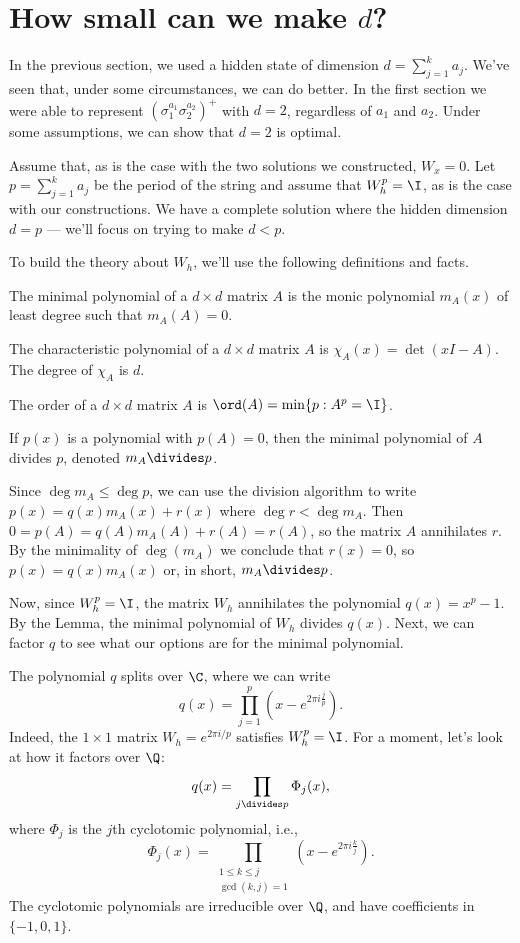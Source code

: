 \section*{How small can we make $d$?}
In the previous section, we used a hidden state of dimension $d = \sum_{j = 1}^k a_j$. We've seen that, under some circumstances, we can do better. In the first section we were able to represent $(\sigma_1^{a_1} \sigma_2^{a_2})^+$ with $d = 2$, regardless of $a_1$ and $a_2$. Under some assumptions, we can show that $d = 2$ is optimal.

Assume that, as is the case with the two solutions we constructed, $W_x = 0$. Let $p = \sum_{j = 1}^k a_j$ be the period of the string and assume that $W_h^p = \I$, as is the case with our constructions. We have a complete solution where the hidden dimension $d = p$ — we'll focus on trying to make $d < p$.

To build the theory about $W_h$, we'll use the following definitions and facts.

 The minimal polynomial of a $d \times d$ matrix $A$ is the monic polynomial $m_A(x)$ of least degree such that $m_A(A) = 0$.\eddefn

 The characteristic polynomial of a $d \times d$ matrix $A$ is $\chi_A(x) = \det(xI - A)$. The degree of $\chi_A$ is $d$.\eddefn

\bddefn[Order] The order of a $d \times d$ matrix $A$ is $\ord(A) = \min \{p : A^p = \I\}$.\eddefn

\bllem If $p(x)$ is a polynomial with $p(A) = 0$, then the minimal polynomial of $A$ divides $p$, denoted $m_A \divides p$.\ellem

\bpf Since $\deg m_A \leq \deg p$, we can use the division algorithm to write $p(x) = q(x) m_A(x) + r(x)$ where $\deg r < \deg m_A$. Then $0 = p(A) = q(A) m_A(A) + r(A) = r(A)$, so the matrix $A$ annihilates $r$. By the minimality of $\deg(m_A)$ we conclude that $r(x) = 0$, so $p(x) = q(x) m_A(x)$ or, in short, $m_A \divides p$.\epf

Now, since $W_h^p = \I$, the matrix $W_h$ annihilates the polynomial $q(x) = x^p - 1$. By the Lemma, the minimal polynomial of $W_h$ divides $q(x)$. Next, we can factor $q$ to see what our options are for the minimal polynomial.

The polynomial $q$ splits over $\C$, where we can write \[ q(x) = \prod_{j=1}^p \left(x - e^{2 \pi i \frac{j}{p}}\right). \] Indeed, the $1 \times 1$ matrix $W_h = e^{2 \pi i / p}$ satisfies $W_h^p = \I$. For a moment, let's look at how it factors over $\Q$: \[ q(x) = \prod_{j \divides p} \Phi_j(x), \] where $\Phi_j$ is the $j$th cyclotomic polynomial, i.e., \[ \Phi_j(x) = \prod_{\substack{1 \leq k \leq j \\ \gcd(k, j) = 1}} \left(x - e^{2 \pi i \frac{k}{j}}\right). \] The cyclotomic polynomials are irreducible over $\Q$, and have coefficients in $\{-1, 0, 1\}$.

